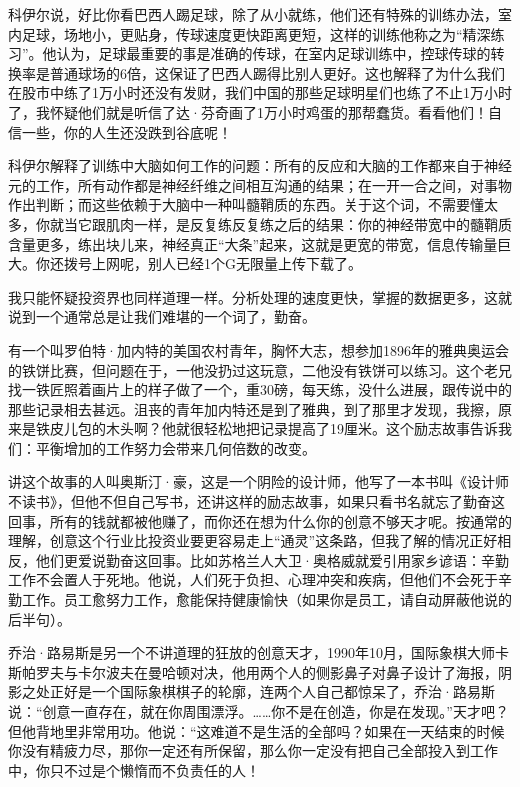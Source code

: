 科伊尔说，好比你看巴西人踢足球，除了从小就练，他们还有特殊的训练办法，室内足球，场地小，更贴身，传球速度更快距离更短，这样的训练他称之为``精深练习''。他认为，足球最重要的事是准确的传球，在室内足球训练中，控球传球的转换率是普通球场的6倍，这保证了巴西人踢得比别人更好。这也解释了为什么我们在股市中练了1万小时还没有发财，我们中国的那些足球明星们也练了不止1万小时了，我怀疑他们就是听信了达·芬奇画了1万小时鸡蛋的那帮蠢货。看看他们！自信一些，你的人生还没跌到谷底呢！

科伊尔解释了训练中大脑如何工作的问题：所有的反应和大脑的工作都来自于神经元的工作，所有动作都是神经纤维之间相互沟通的结果；在一开一合之间，对事物作出判断；而这些依赖于大脑中一种叫髓鞘质的东西。关于这个词，不需要懂太多，你就当它跟肌肉一样，是反复练反复练之后的结果：你的神经带宽中的髓鞘质含量更多，练出块儿来，神经真正``大条''起来，这就是更宽的带宽，信息传输量巨大。你还拨号上网呢，别人已经1个G无限量上传下载了。

我只能怀疑投资界也同样道理一样。分析处理的速度更快，掌握的数据更多，这就说到一个通常总是让我们难堪的一个词了，勤奋。

有一个叫罗伯特·加内特的美国农村青年，胸怀大志，想参加1896年的雅典奥运会的铁饼比赛，但问题在于，一他没扔过这玩意，二他没有铁饼可以练习。这个老兄找一铁匠照着画片上的样子做了一个，重30磅，每天练，没什么进展，跟传说中的那些记录相去甚远。沮丧的青年加内特还是到了雅典，到了那里才发现，我擦，原来是铁皮儿包的木头啊？他就很轻松地把记录提高了19厘米。这个励志故事告诉我们：平衡增加的工作努力会带来几何倍数的改变。

讲这个故事的人叫奥斯汀·豪，这是一个阴险的设计师，他写了一本书叫《设计师不读书》，但他不但自己写书，还讲这样的励志故事，如果只看书名就忘了勤奋这回事，所有的钱就都被他赚了，而你还在想为什么你的创意不够天才呢。按通常的理解，创意这个行业比投资业要更容易走上``通灵''这条路，但我了解的情况正好相反，他们更爱说勤奋这回事。比如苏格兰人大卫·奥格威就爱引用家乡谚语：辛勤工作不会置人于死地。他说，人们死于负担、心理冲突和疾病，但他们不会死于辛勤工作。员工愈努力工作，愈能保持健康愉快（如果你是员工，请自动屏蔽他说的后半句）。

乔治·路易斯是另一个不讲道理的狂放的创意天才，1990年10月，国际象棋大师卡斯帕罗夫与卡尔波夫在曼哈顿对决，他用两个人的侧影鼻子对鼻子设计了海报，阴影之处正好是一个国际象棋棋子的轮廓，连两个人自己都惊呆了，乔治·路易斯说：``创意一直存在，就在你周围漂浮。\ldots{}\ldots{}你不是在创造，你是在发现。''天才吧？但他背地里非常用功。他说：``这难道不是生活的全部吗？如果在一天结束的时候你没有精疲力尽，那你一定还有所保留，那么你一定没有把自己全部投入到工作中，你只不过是个懒惰而不负责任的人！

